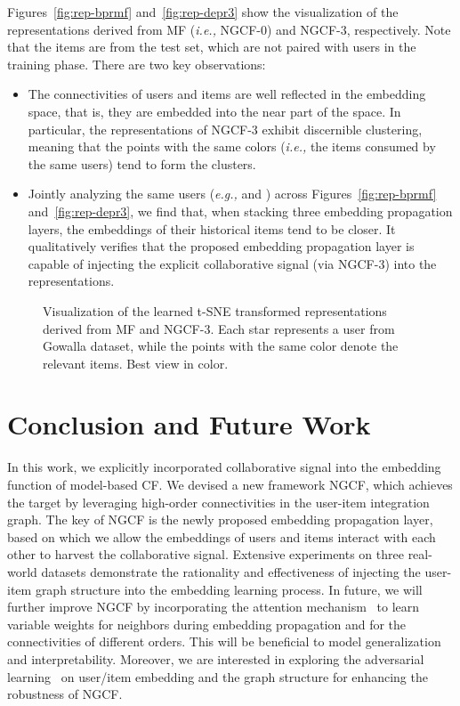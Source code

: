 \documentclass[sigconf]{acmart}
\newcommand{\ie}{\emph{i.e., }}
\newcommand{\eg}{\emph{e.g., }}
\theoremstyle{definition}
\begin{document}
Figures~\ref{fig:rep-bprmf} and~\ref{fig:rep-depr3} show the visualization of the representations derived from MF (\ie NGCF-0) and NGCF-3, respectively.
Note that the items are from the test set, which are not paired with users in the training phase.
There are two key observations:
\begin{itemize}[leftmargin=*]
\item The connectivities of users and items are well reflected in the embedding space, that is, they are embedded into the near part of the space.
In particular, the representations of NGCF-3 exhibit discernible clustering, meaning that the points with the same colors (\ie the items consumed by the same users) tend to form the clusters.

\item Jointly analyzing the same users (\eg  and ) across Figures~\ref{fig:rep-bprmf} and~\ref{fig:rep-depr3}, we find that, when stacking three embedding propagation layers, the embeddings of their historical items tend to be closer.
It qualitatively verifies that the proposed embedding propagation layer is capable of injecting the explicit collaborative signal (via NGCF-3) into the representations.

\end{itemize}

\begin{figure}[t]
\centering
{}
\vspace{-10pt}
\caption{Visualization of the learned t-SNE transformed representations derived from MF and NGCF-3.
Each star represents a user from Gowalla dataset, while the points with the same color denote the relevant items. Best view in color.}
\label{fig:gamma-effect}\vspace{-15pt}
\end{figure} \section{Conclusion and Future Work}

In this work, we explicitly incorporated collaborative signal into the embedding function of model-based CF.
We devised a new framework NGCF, which achieves the target by leveraging high-order connectivities in the user-item integration graph.
The key of NGCF is the newly proposed embedding propagation layer, based on which we allow the embeddings of users and items interact with each other to harvest the collaborative signal.
Extensive experiments on three real-world datasets demonstrate the rationality and effectiveness of injecting the user-item graph structure into the embedding learning process. In future, we will further improve NGCF by incorporating the attention mechanism~\cite{ACF} to learn variable weights for neighbors during embedding propagation and for the connectivities of different orders. This will be beneficial to model generalization and interpretability. 
Moreover, we are interested in exploring the adversarial learning~\cite{APR} on user/item embedding and the graph structure for enhancing the robustness of NGCF.
\end{document}
